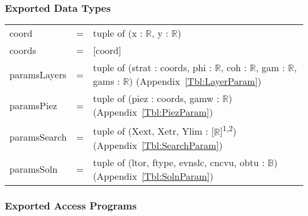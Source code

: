 \documentclass[12pt, titlepage]{article}
\begin{document}
\subsubsection{Exported Data Types}
\renewcommand*{\arraystretch}{1.5}
\begin{longtable}{p{} c p{}}
	coord &=& tuple of (x : $\mathbb{R}$, y : $\mathbb{R}$) \\
	coords &=& [coord] \\
	paramsLayers &=& tuple of (strat : coords, phi : $\mathbb{R}$, coh : 
	$\mathbb{R}$, gam : $\mathbb{R}$, gams : $\mathbb{R}$) 
	(Appendix~\ref{Tbl:LayerParam})\\
	paramsPiez &=& tuple of (piez : coords, gamw : $\mathbb{R}$) 
	(Appendix~\ref{Tbl:PiezParam}) \\
	paramsSearch &=& tuple of (Xext, Xetr, Ylim : 
	[$\mathbb{R}$]\textsuperscript{1,2}) (Appendix~\ref{Tbl:SearchParam}) \\
	paramsSoln &=& tuple of (ltor, ftype, evnslc, cncvu, obtu : 
	$\mathbb{B}$) (Appendix~\ref{Tbl:SolnParam}) \\
\end{longtable}

\subsubsection{Exported Access Programs}
\end{document}
